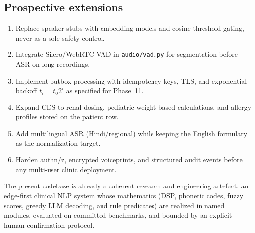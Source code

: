 \documentclass[11pt,a4paper]{article}
\begin{document}
\subsection{Prospective extensions}
\begin{enumerate}[leftmargin=1.4em]
  \item Replace speaker stubs with embedding models and cosine-threshold gating, never as a sole safety control.
  \item Integrate Silero/WebRTC VAD in \texttt{audio/vad.py} for segmentation before ASR on long recordings.
  \item Implement outbox processing with idempotency keys, TLS, and exponential backoff $t_i = t_0 2^{i}$ as specified for Phase~11.
  \item Expand CDS to renal dosing, pediatric weight-based calculations, and allergy profiles stored on the patient row.
  \item Add multilingual ASR (Hindi/regional) while keeping the English formulary as the normalization target.
  \item Harden authn/z, encrypted voiceprints, and structured audit events before any multi-user clinic deployment.
\end{enumerate}

The present codebase is already a coherent research and engineering artefact: an edge-first clinical NLP system whose mathematics (DSP, phonetic codes, fuzzy scores, greedy LLM decoding, and rule predicates) are realized in named modules, evaluated on committed benchmarks, and bounded by an explicit human confirmation protocol.
\end{document}
